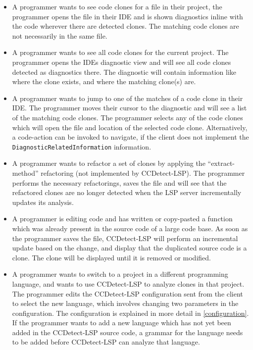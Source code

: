 \begin{itemize} 

    \item A programmer wants to see code clones for a file in their project, the
        programmer opens the file in their IDE and is shown diagnostics inline with the
        code wherever there are detected clones. The matching code clones are not
        necessarily in the same file.

	\item A programmer wants to see all code clones for the current project. The
	      programmer opens the IDEs diagnostic view and will see all code clones detected
	      as diagnostics there. The diagnostic will contain information like where the clone
	      exists, and where the matching clone(s) are.

    \item A programmer wants to jump to one of the matches of a code clone in their IDE.
        The programmer moves their cursor to the diagnostic and will see a list of the
        matching code clones. The programmer selects any of the code clones which will
        open the file and location of the selected code clone. Alternatively, a
        code-action can be invoked to navigate, if the client does not implement the
        \verb|DiagnosticRelatedInformation| information.


      \item A programmer wants to refactor a set of clones by applying the
          ``extract-method'' refactoring (not implemented by CCDetect-LSP). The programmer
          performs the necessary refactorings, saves the file and will see that the
          refactored clones are no longer detected when the LSP server incrementally
          updates its analysis.

      \item A programmer is editing code and has written or copy-pasted a function which
          was already present in the source code of a large code base. As soon as the
          programmer saves the file, CCDetect-LSP will perform an incremental update based
          on the change, and display that the duplicated source code is a clone. The clone
          will be displayed until it is removed or modified.

      \item A programmer wants to switch to a project in a different programming language,
          and wants to use CCDetect-LSP to analyze clones in that project. The programmer
          edits the CCDetect-LSP configuration sent from the client to select the new
          language, which involves changing two parameters in the configuration. The
          configuration is explained in more detail in \cref{configuration}. If the
          programmer wants to add a new language which has not yet been added in the
          CCDetect-LSP source code, a grammar for the language needs to be added before
          CCDetect-LSP can analyze that language.


\end{itemize}
